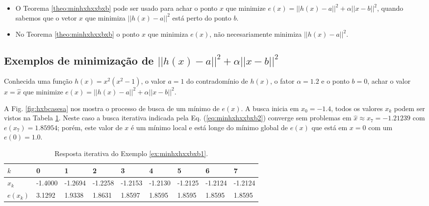 \begin{tcbattention}
\begin{itemize}
\item O Teorema \ref{theo:minhxhxxbxb} pode ser usado para achar o ponto $x$
que minimize $e(x)=||h(x)-a||^2+\alpha||x-b||^2$,
quando sabemos que o vetor $x$ que minimiza $||h(x)-a||^2$ 
está perto do ponto $b$.
\item No Teorema \ref{theo:minhxhxxbxb} o ponto $x$ que minimiza $e(x)$, 
não necesariamente minimiza  $||h(x)-a||^2$.
\end{itemize}
\end{tcbattention}


\subsection{Exemplos de minimização de $||h(x)-a||^2+\alpha ||x-b||^2$}


\begin{example}\label{ex:minhxhxxbxb1}
Conhecida uma função $h(x)=x^2(x^2-1)$, o valor $a=1$ do contradomínio de $h(x)$,
o fator $\alpha=1.2$ e o ponto $b=0$,
achar o valor $x=\hat{x}$ que minimize $e(x)=||h(x)-a||^2+\alpha||x-b||^2$.
\end{example}
\begin{SolutionT}\label{sol:minhxhxxbxb1}


 A Fig. \ref{fig:hxbcasesa} nos mostra o processo de busca de um mínimo
 de $e(x)$. A busca inicia em $x_0=-1.4$,
 todos os valores $x_{k}$ podem ser vistos na Tabela \ref{tab:hxbcases1}. 
Neste caso a busca iterativa indicada pela Eq. (\ref{eq:minhxhxxbxb2}) converge sem problemas 
em $\hat{x}\approx x_7 =-1.21239$ com $e(x_7)=1.85954$; porém, 
 este valor de $x$ é um mínimo local e está longe do mínimo
 global de  $e(x)$ que está em $x=0$ com um $e(0)=1.0$.

\end{SolutionT}



\begin{table}[!h]
\centering
\begin{tabular}{|l|l|l|l|l|l|l|l|l|}
\hline
$k$      & 0 & 1 & 2 & 3 & 4 & 5 & 6 & 7 \\ \hline
$x_k$    & -1.4000 & -1.2694 & -1.2258 & -1.2153 & -1.2130 & -1.2125 & -1.2124 & -1.2124 \\ \hline
$e(x_k)$ & 3.1292 & 1.9338 & 1.8631 & 1.8597 & 1.8595 & 1.8595 & 1.8595 & 1.8595 \\ \hline
\end{tabular}
\caption{Resposta iterativa do Exemplo \ref{ex:minhxhxxbxb1}.}
\label{tab:hxbcases1}
\end{table}

